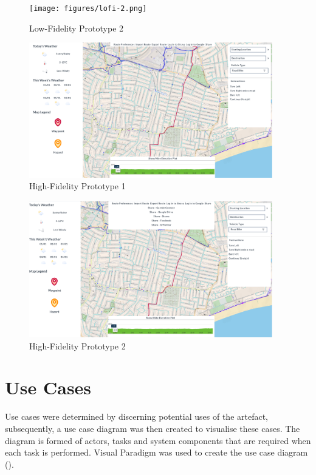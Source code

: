   \begin{figure}[!ht]
    \centering
    \texttt{[image: figures/lofi-2.png]}
    \caption{Low-Fidelity Prototype 2}
    \label{fig:lofi2}
  \end{figure}

  \begin{figure}[!ht]
    \centering
    \includegraphics[width=400px]{figures/hifi-1.png}
    \caption{High-Fidelity Prototype 1}
    \label{fig:hifi1}
  \end{figure}

  \begin{figure}[!ht]
    \centering
    \includegraphics[width=400px]{figures/hifi-2.png}
    \caption{High-Fidelity Prototype 2}
    \label{fig:hifi2}
  \end{figure}

  \clearpage
\section{Use Cases}
\label{design:usecase}
Use cases were determined by discerning potential uses of the artefact, subsequently, a use case diagram was then created to visualise these cases. The diagram is formed of actors, tasks and system components that are required when each task is performed. Visual Paradigm was used to create the use case diagram (\cite{noauthor_ideal_nodate}).

